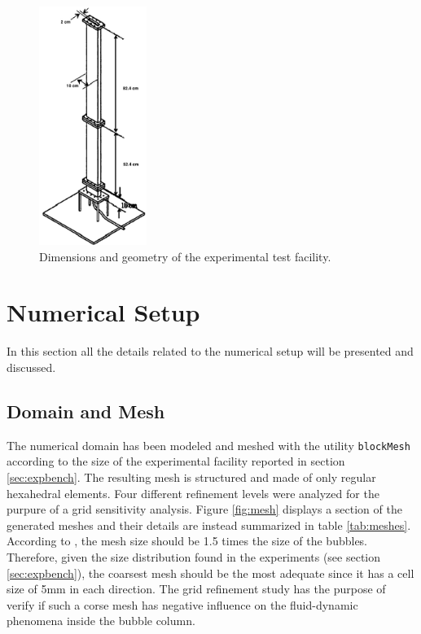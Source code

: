 \documentclass[11pt,a4paper]{article}
\begin{document}
\begin{figure}[!ht]
	\centering
	\includegraphics[width=3.5cm]{Images/test_facility.png}
	\caption{Dimensions and geometry of the experimental test facility.}
	\label{fig:facility}
\end{figure}

\section{Numerical Setup}
\label{sec:numsetup}
In this section all the details related to the numerical setup will be presented and discussed.




\subsection{Domain and Mesh}
\label{sub:domain}
The numerical domain has been modeled and meshed with the utility \texttt{blockMesh} according to the size of the experimental facility reported in section \ref{sec:expbench}. The resulting mesh is structured and made of only regular hexahedral elements. Four different refinement levels were analyzed for the purpure of a grid sensitivity analysis. Figure \ref{fig:mesh} displays a section of the generated meshes and their details are instead summarized in table \ref{tab:meshes}. According to \cite{krepper}, the mesh size should be 1.5 times the size of the bubbles. Therefore, given the size distribution found in the experiments (see section \ref{sec:expbench}),  the coarsest mesh should be the most adequate since it has a cell size of 5mm in each direction. The grid refinement study has the purpose of verify if such a corse mesh has  negative influence on the fluid-dynamic phenomena inside the bubble column.
 
\end{document}
